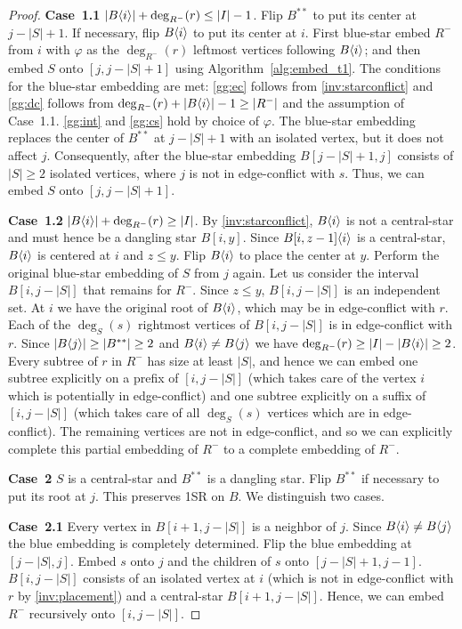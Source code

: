 \documentclass[11pt,a4paper,colorlinks=true,urlcolor=blue,citecolor=red]{article}
\theoremstyle{plain}
\newcommand{\case}[1]{\par\vspace{.5\baselineskip}\noindent\textbf{\sffamily Case~#1}}
\begin{document}
\begin{proof}
  \case{1.1} $|B\langle{i}\rangle|+\deg_{R^-}(r)\leq|I|-1$. Flip $B^{**}$ to put
  its center at $j-|S|+1$. If necessary, flip $B\langle{i}\rangle$ to put its
  center at $i$. First blue-star embed $R^-$ from $i$ with $\varphi$
  as the $\deg_{R^-}(r)$ leftmost vertices following $B\langle{i}\rangle$; and
  then embed $S$ onto $[j,j-|S|+1]$ using Algorithm~\ref{alg:embed_t1}.
  The conditions for the blue-star embedding are met: \ref{gg:ec}
  follows from \ref{inv:starconflict} and \ref{gg:dc} follows from
  $\deg_{R^-}(r)+|B\langle{i}\rangle|-1\geq|R^-|$ and the assumption of
  Case~1.1. \ref{gg:int} and \ref{gg:cs} hold by choice of $\varphi$. The
  blue-star embedding replaces the center of $B^{**}$ at $j-|S|+1$
  with an isolated vertex, but it does not affect $j$. Consequently,
  after the blue-star embedding $B[j-|S|+1,j]$ consists of $|S|\geq 2$
  isolated vertices, where $j$ is not in edge-conflict with $s$. Thus,
  we can embed $S$ onto $[j,j-|S|+1]$.

  \case{1.2} $|B\langle{i}\rangle|+\deg_{R^-}(r)\geq|I|$. By
  \ref{inv:starconflict}, $B\langle{i}\rangle$ is not a central-star and must
  hence be a dangling star $B[i,y]$. Since $B{[i,z-1]}\langle{i}\rangle$ is a
  central-star, $B\langle{i}\rangle$ is centered at $i$ and $z\leq y$. Flip
  $B\langle{i}\rangle$ to place the center at $y$. Perform the original
  blue-star embedding of $S$ from $j$ again. Let us consider the
  interval $B[i,j-|S|]$ that remains for $R^-$. Since $z\leq y$,
  $B[i,j-|S|]$ is an independent set. At $i$ we have the original root
  of $B\langle{i}\rangle$, which may be in edge-conflict with $r$. Each of the
  $\deg_S(s)$ rightmost vertices of $B[i,j-|S|]$ is in edge-conflict
  with $r$. Since $|B\langle{j}\rangle|\geq|B^{**}|\geq2$ and
  $B\langle{i}\rangle\neq B\langle{j}\rangle$ we have
  $\deg_{R^-}(r)\geq|I|-|B\langle{i}\rangle|\geq2$. Every subtree of $r$ in
  $R^-$ has size at least $|S|$, and hence we can embed one subtree
  explicitly on a prefix of $[i,j-|S|]$ (which takes care of the vertex
  $i$ which is potentially in edge-conflict) and one subtree explicitly on
  a suffix of $[i,j-|S|]$ (which takes care of all $\deg_S(s)$ vertices
  which are in edge-conflict). The remaining vertices are not in
  edge-conflict, and so we can explicitly complete this partial
  embedding of $R^-$ to a complete embedding of $R^-$.

  \case{2} $S$ is a central-star and $B^{**}$ is a dangling star.
  Flip $B^{**}$ if necessary to put its root at $j$. This preserves
  1SR on $B$. We distinguish two cases.

  \case{2.1} Every vertex in $B[i+1,j-|S|]$ is a neighbor of $j$.
  Since $B\langle{i}\rangle\neq B\langle{j}\rangle$ the blue embedding is completely
  determined. Flip the blue embedding at $[j-|S|,j]$. Embed $s$ onto
  $j$ and the children of $s$ onto $[j-|S|+1,j-1]$. $B[i,j-|S|]$
  consists of an isolated vertex at $i$ (which is not in edge-conflict
  with $r$ by \ref{inv:placement}) and a central-star $B[i+1,j-|S|]$.
  Hence, we can embed $R^-$ recursively onto $[i,j-|S|]$.


\end{proof}
\end{document}
